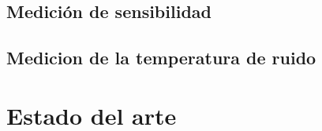 \subsection{Medición de sensibilidad}

\subsection{Medicion de la temperatura de ruido}

\section{Estado del arte}









